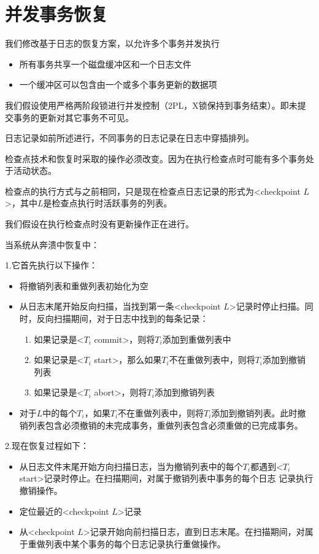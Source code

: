 \section{并发事务恢复}

我们修改基于日志的恢复方案，以允许多个事务并发执行
\begin{itemize}
    \item 所有事务共享一个磁盘缓冲区和一个日志文件
    \item 一个缓冲区可以包含由一个或多个事务更新的数据项
\end{itemize}

我们假设使用严格两阶段锁进行并发控制（2PL，X锁保持到事务结束）。即未提交事务的更新对其它事务不可见。

日志记录如前所述进行，不同事务的日志记录在日志中穿插排列。

检查点技术和恢复时采取的操作必须改变。因为在执行检查点时可能有多个事务处于活动状态。

检查点的执行方式与之前相同，只是现在检查点日志记录的形式为<checkpoint $L$>，其中$L$是检查点执行时活跃事务的列表。

我们假设在执行检查点时没有更新操作正在进行。

当系统从奔溃中恢复中：

\noindent 1.它首先执行以下操作：
\begin{itemize}
    \item 将撤销列表和重做列表初始化为空
    \item 从日志末尾开始反向扫描，当找到第一条<checkpoint $L$>记录时停止扫描。同时，反向扫描期间，对于日志中找到的每条记录：
       \begin{enumerate}
          \item 如果记录是<$T_i$ commit>，则将$T_i$添加到重做列表中
          \item 如果记录是<$T_i$ start>，那么如果$T_i$不在重做列表中，则将$T_i$添加到撤销列表
          \item 如果记录是<$T_i$ abort>，则将$T_i$添加到撤销列表
       \end{enumerate}
    \item 对于$L$中的每个$T_i$，如果$T_i$不在重做列表中，则将$T_i$添加到撤销列表。此时撤销列表包含必须撤销的未完成事务，重做列表包含必须重做的已完成事务。
\end{itemize}

\noindent 2.现在恢复过程如下：
\begin{itemize}
    \item 从日志文件末尾开始方向扫描日志，当为撤销列表中的每个$T_i$都遇到<$T_i$ start>记录时停止。在扫描期间，对属于撤销列表中事务的每个日志 记录执行撤销操作。
    \item 定位最近的<checkpoint $L$>记录 
    \item 从<checkpoint $L$>记录开始向前扫描日志，直到日志末尾。在扫描期间，对属于重做列表中某个事务的每个日志记录执行重做操作。
\end{itemize}